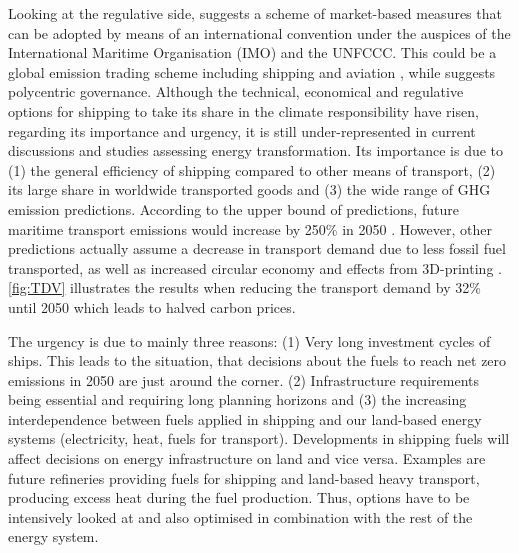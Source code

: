 \documentclass[article]{elsarticle}
\begin{document}
Looking at the regulative side, \citet{SHI2016} suggests a scheme of market-based measures that can be adopted by means of an international convention under the auspices of the International Maritime Organisation (IMO) and the UNFCCC. This could be a global emission trading scheme including shipping and aviation \cite{Dessens2014}, while \citet{GRITSENKO2017} suggests polycentric governance.
Although the technical, economical and regulative options for shipping to take its share in the climate responsibility have risen, regarding its importance and urgency, it is still under-represented in current discussions and studies assessing energy transformation. Its importance is due to (1) the general efficiency of shipping compared to other means of transport, (2) its large share in worldwide transported goods and (3) the wide range of GHG emission  predictions. According to the upper bound of predictions, future maritime transport emissions would increase by 250\% in 2050 \cite{EuropeanCommission2018}. However, other predictions actually assume a decrease in transport demand due to less fossil fuel transported, as well as increased circular economy and effects from 3D-printing \cite{ITF2018}. \autoref{fig:TDV} illustrates the results when reducing the transport demand by 32\% until 2050 which leads to halved carbon prices. %

The urgency is due to mainly three reasons: (1) Very long investment cycles of ships. This leads to the situation, that decisions about the fuels to reach net zero emissions in 2050 are just around the corner. (2) Infrastructure requirements being essential and requiring long planning horizons and (3) the increasing interdependence between fuels applied in shipping and our land-based energy systems (electricity, heat, fuels for transport). Developments in shipping fuels will affect decisions on energy infrastructure on land and vice versa. Examples are future refineries providing fuels for shipping and land-based heavy transport, producing excess heat during the fuel production. Thus, options have to be intensively looked at and also optimised in combination with the rest of the energy system. 
\end{document}
